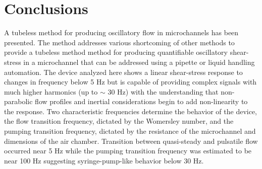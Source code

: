 \section{Conclusions}
A tubeless method for producing oscillatory flow in microchannels has been presented. The method addresses various shortcoming of other methods to provide a tubeless method method for producing quantifiable oscillatory shear-stress in a microchannel that can be addressed using a pipette or liquid handling automation. The device analyzed here shows a linear shear-stress response to changes in frequency below 5 Hz but is capable of providing complex signals with much higher harmonics (up to $\sim$ 30 Hz) with the understanding that non-parabolic flow profiles and inertial considerations begin to add non-linearity to the response. Two characteristic frequencies determine the behavior of the device, the flow transition frequency, dictated by the Womersley number, and the pumping transition frequency, dictated by the resistance of the microchannel and dimensions of the air chamber. Transition between quasi-steady and pulsatile flow occurred near 5 Hz while the pumping transition frequency was estimated to be near 100 Hz suggesting syringe-pump-like behavior below 30 Hz.







